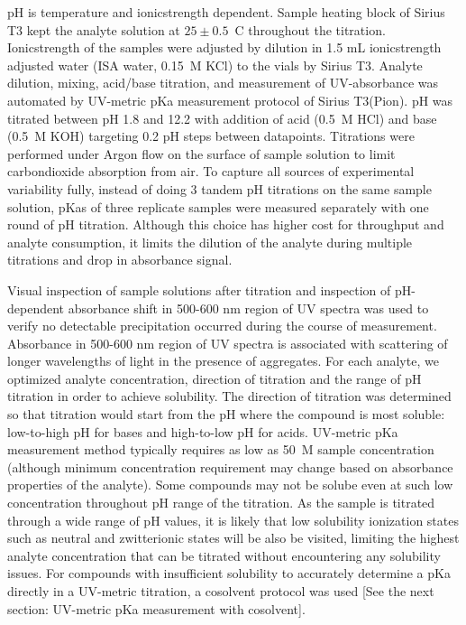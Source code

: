 \documentclass[9pt,lineno]{elife}
\begin{document}
pH is temperature and ionic\textendash strength dependent. Sample heating block of Sirius T3 kept the analyte solution at $25 \pm 0.5$~\textdegree C throughout the titration. Ionic\textendash strength of the samples were adjusted by dilution in 1.5 mL ionic\textendash strength adjusted water (ISA water, 0.15~M KCl) to the vials by Sirius T3.  Analyte dilution, mixing, acid/base titration, and measurement of UV-absorbance was automated by UV-metric pKa measurement protocol of Sirius T3(Pion). pH was titrated between pH 1.8 and 12.2 with addition of acid (0.5~M HCl) and base (0.5~M KOH) targeting 0.2 pH steps between datapoints. Titrations were performed under Argon flow on the surface of sample solution to limit carbondioxide absorption from air. To capture all sources of experimental variability fully, instead of doing 3 tandem pH titrations on the same sample solution, pKas of three replicate samples were measured separately with one round of pH titration. Although this choice has higher cost for throughput and analyte consumption, it limits the dilution of the analyte during multiple titrations and drop in absorbance signal. 

Visual inspection of sample solutions after titration and inspection of pH-dependent absorbance shift in 500-600 nm region of UV spectra was used to verify no detectable precipitation occurred during the course of measurement. Absorbance in 500-600 nm region of UV spectra is associated with scattering of longer wavelengths of light in the presence of aggregates. For each analyte, we optimized analyte concentration, direction of titration and the range of pH titration in order to achieve solubility. The direction of titration was determined so that titration would start from the pH where the compound is most soluble: low-to-high pH for bases and high-to-low pH for acids. UV-metric pKa measurement method typically requires as low as 50~\micro M sample concentration (although minimum concentration requirement may change based on absorbance properties of the analyte). Some compounds may not be solube even at such low concentration throughout pH range of the titration. As the sample is titrated through a wide range of pH values, it is likely that low solubility ionization states such as neutral and zwitterionic states will be also be visited, limiting the highest analyte concentration that can be titrated without encountering any solubility issues.  For compounds with insufficient solubility to accurately determine a pKa directly in a UV-metric titration, a cosolvent protocol was used [See the next section: UV-metric pKa measurement with cosolvent]. 
\end{document}
